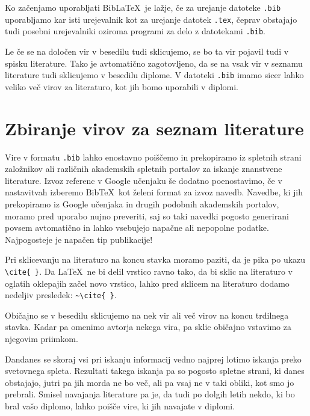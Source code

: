 Ko začenjamo uporabljati BibLaTeX\ je lažje, če za urejanje datoteke \texttt{.bib} uporabljamo kar
isti urejevalnik kot za urejanje datotek \texttt{.tex}, čeprav obstajajo tudi posebni urejevalniki
oziroma programi za delo z datotekami \texttt{.bib}.

Le če se  na določen vir v besedilu tudi sklicujemo, se bo ta vir pojavil tudi v spisku literature.
Tako je avtomatično zagotovljeno, da se na vsak vir v seznamu literature tudi sklicujemo v besedilu diplome.
V datoteki \texttt{.bib} imamo sicer lahko veliko več virov za literaturo, kot jih bomo uporabili v diplomi.


\section{Zbiranje virov za seznam literature}

Vire v formatu \texttt{.bib} lahko enostavno poiščemo in prekopiramo iz spletnih strani založnikov
ali različnih akademskih spletnih portalov za iskanje znanstvene literature.
Izvoz referenc v Google učenjaku še dodatno poenostavimo, če v nastavitvah izberemo BibTeX\ kot
želeni format za izvoz navedb.
Navedbe, ki jih prekopiramo iz Google učenjaka in drugih podobnih akademskih portalov, moramo pred
uporabo nujno preveriti, saj so taki navedki pogosto generirani povsem avtomatično in lahko
vsebujejo napačne ali nepopolne podatke.
Najpogosteje je napačen tip publikacije!

Pri sklicevanju na literaturo na koncu stavka moramo paziti, da je pika po ukazu \verb=\cite{ }=.
Da \LaTeX\ ne bi delil vrstico ravno tako, da bi sklic na literaturo v oglatih oklepajih začel novo
vrstico, lahko pred sklicem na literaturo dodamo nedeljiv presledek: \verb=~\cite{ }=.

Običajno se v besedilu sklicujemo  na nek vir ali več virov na koncu trdilnega stavka.
Kadar pa omenimo avtorja nekega vira, pa sklic običajno vstavimo za njegovim priimkom.

Dandanes se skoraj vsi pri iskanju informacij vedno najprej lotimo iskanja preko svetovnega spleta.
Rezultati takega iskanja pa so pogosto spletne strani, ki danes obstajajo, jutri pa jih morda ne bo
več, ali pa vsaj ne v taki obliki, kot smo jo prebrali.
Smisel navajanja literature pa je, da tudi po dolgih letih nekdo, ki bo bral vašo diplomo, lahko
poišče vire, ki jih navajate v diplomi.

